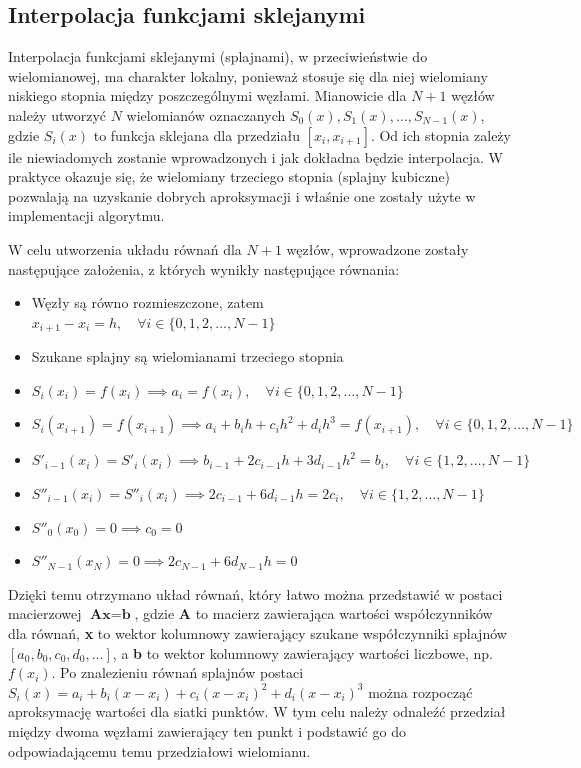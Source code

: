 \documentclass[a4paper,12pt]{article}
\begin{document}
  	\subsection{Interpolacja funkcjami sklejanymi}
  	Interpolacja funkcjami sklejanymi (splajnami), w przeciwieństwie do wielomianowej, ma charakter lokalny, ponieważ stosuje się dla niej wielomiany niskiego stopnia między poszczególnymi węzłami. Mianowicie dla $N+1$ węzłów należy utworzyć $N$ wielomianów oznaczanych $S_0(x), S_1(x), \dots, S_{N-1}(x)$, gdzie $S_i(x)$ to funkcja sklejana dla przedziału $[x_i, x_{i+1}]$. Od ich stopnia zależy ile niewiadomych zostanie wprowadzonych i jak dokładna będzie interpolacja. W praktyce okazuje się, że wielomiany trzeciego stopnia (splajny kubiczne) pozwalają na uzyskanie dobrych aproksymacji i właśnie one zostały użyte w implementacji algorytmu. 
  	\par W celu utworzenia układu równań dla $N+1$ węzłów, wprowadzone zostały następujące założenia, z których wynikły następujące równania:
  	\begin{itemize}
  		\item Węzły są równo rozmieszczone, zatem $x_{i+1}-x_i=h, \quad \forall i \in \{0, 1, 2, \dots, N-1\}$
  		\item Szukane splajny są wielomianami trzeciego stopnia
  		\item $S_i(x_i)=f(x_i) \implies a_i = f(x_i), \quad \forall i \in \{0, 1, 2, \dots, N-1\}$
  		\item $S_i(x_{i+1})=f(x_{i+1}) \implies a_i + b_ih + c_ih^2 + d_ih^3 = f(x_{i+1}), \quad \forall i \in \{0, 1, 2, \dots, N-1\}$
  		\item $S'_{i-1}(x_i)=S'_i(x_i) \implies b_{i-1} + 2c_{i-1}h + 3d_{i-1}h^2 = b_i, \quad \forall i \in \{1, 2, \dots, N-1\}$
  		\item $S''_{i-1}(x_i)=S''_i(x_i) \implies 2c_{i-1} + 6d_{i-1}h = 2c_i, \quad \forall i \in \{1, 2, \dots, N-1\}$
  		\item $S''_0(x_0)=0 \implies c_0=0$
  		\item $S''_{N-1}(x_N)=0 \implies 2c_{N-1} + 6d_{N-1}h = 0$
  	\end{itemize}
  	\par Dzięki temu otrzymano układ równań, który łatwo można przedstawić w postaci macierzowej $\textbf{A}\textbf{x}=\textbf{b}$, gdzie \textbf{A} to macierz zawierająca wartości współczynników dla równań, \textbf{x} to wektor kolumnowy zawierający szukane współczynniki splajnów $[a_0, b_0, c_0, d_0, \dots]$, a \textbf{b} to wektor kolumnowy zawierający wartości liczbowe, np. $f(x_i)$.
  	Po znalezieniu równań splajnów postaci $S_i(x)=a_i+b_i(x-x_i)+c_i(x-x_i)^2+d_i(x-x_i)^3$ można rozpocząć aproksymację wartości dla siatki punktów. W tym celu należy odnaleźć przedział między dwoma węzłami zawierający ten punkt i podstawić go do odpowiadającemu temu przedziałowi wielomianu.
  	
\end{document}

